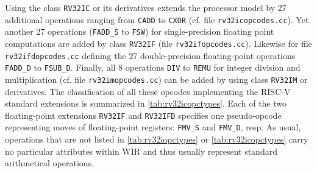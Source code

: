 Using the class \texttt{RV32IC} or its derivatives extends the processor model by 27 additional operations ranging from \texttt{CADD} to \texttt{CXOR} (cf. file \texttt{rv32icopcodes.cc}).
Yet another 27 operations (\texttt{FADD\_S} to \texttt{FSW}) for single-precision floating point computations are added by class \texttt{RV32IF} (file \texttt{rv32ifopcodes.cc}).
Likewise for file \texttt{rv32ifdopcodes.cc} defining the 27 double-precision floating-point operations \texttt{FADD\_D} to \texttt{FSUB\_D}.
Finally, all 8 operations \texttt{DIV} to \texttt{REMU} for integer division and multiplication (cf. file \texttt{rv32imopcodes.cc}) can be added by using class \texttt{RV32IM} or derivatives.
The classification of all these opcodes implementing the RISC-V standard extensions is summarized in \cref{tab:rv32icopctypes}.
Each of the two floating-point extensions \texttt{RV32IF} and \texttt{RV32IFD} specifies one pseudo-opcode representing moves of floating-point registers: \texttt{FMV\_S} and \texttt{FMV\_D}, resp.
As usual, operations that are not listed in \cref{tab:rv32iopctypes} or \cref{tab:rv32icopctypes} carry no particular attributes within \gls{WIR} and thus usually represent standard arithmetical operations.

